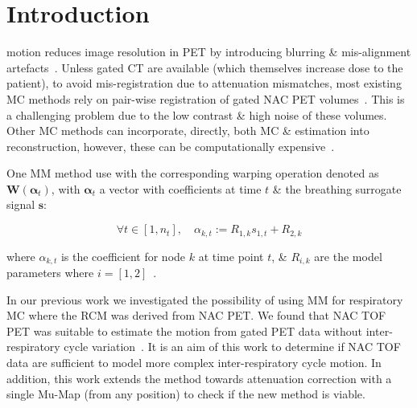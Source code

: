 \section{Introduction} \label{sec:introduction}
     motion reduces image resolution in \gls{PET} by introducing blurring \& mis-alignment artefacts~\cite{Nehmeh2008a}. Unless gated \gls{CT} are available (which themselves increase dose to the patient), to avoid mis-registration due to attenuation mismatches, most existing \gls{MC} methods rely on pair-wise registration of gated \gls{NAC} \gls{PET} volumes~\cite{LungMotionDiaphragmBaiBib}.%
    This is a challenging problem due to the low contrast \& high noise of these volumes. Other \gls{MC} methods can incorporate, directly, both \gls{MC} \&  estimation into reconstruction, however, these can be computationally expensive~\cite{Bousse2016b}.
    
    One \gls{MM} method use  with the corresponding warping operation denoted as $\mathbf{W}(\mathbf{\alpha}_t)$, with $\mathbf{\alpha}_t$ a vector with coefficients at time $t$ \& the breathing surrogate signal $\mathbf{s}$:
    
    \begin{equation}
        \forall t \in [1, n_t],\quad \alpha_{k, t} := R_{1, k} s_{1, t} + R_{2, k}
    \end{equation}
    
    \noindent where $\alpha_{k,t}$ is the coefficient for node $k$ at time point $t$, \& $R_{i,k}$ are the model parameters where $i = [1, 2]$~\cite{McClelland2017}.
    
    In our previous work we investigated the possibility of using \gls{MM} for respiratory \gls{MC} where the \gls{RCM} was derived from \gls{NAC} \gls{PET}. We found that \gls{NAC} \gls{TOF} \gls{PET} was suitable to estimate the motion from gated PET data without inter-respiratory cycle variation~\cite{Whitehead2019ImpactPET}. It is an aim of this work to determine if \gls{NAC} \gls{TOF} data are sufficient to model more complex inter-respiratory cycle motion. In addition, this work extends the method towards attenuation correction with a single \gls{Mu-Map} (from any position) to check if the new method is viable.

